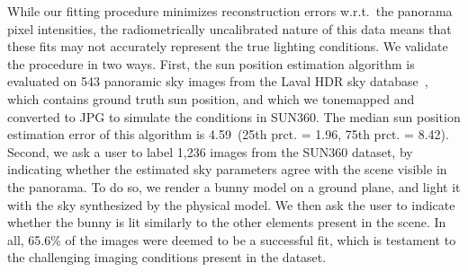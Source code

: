 While our fitting procedure minimizes reconstruction errors w.r.t.\ the panorama pixel intensities, the radiometrically uncalibrated nature of this data means that these fits may not accurately represent the true lighting conditions. We validate the procedure in two ways. First, the sun position estimation algorithm is evaluated on 543 panoramic sky images from the Laval HDR sky database~\cite{hdrdb,lalonde-3dv-14}, which contains ground truth sun position, and which we tonemapped and converted to JPG to simulate the conditions in SUN360. The median sun position estimation error of this algorithm is 4.59\degree ~(25th prct. = 1.96\degree, 75th prct. = 8.42\degree). Second, we ask a user to label 1,236 images from the SUN360 dataset, by indicating whether the estimated sky parameters agree with the scene visible in the panorama. To do so, we render a bunny model on a ground plane, and light it with the sky synthesized by the physical model. We then ask the user to indicate whether the bunny is lit similarly to the other elements present in the scene. In all, 65.6\% of the images were deemed to be a successful fit, which is testament to the challenging imaging conditions present in the dataset.




